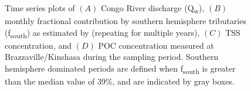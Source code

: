 \begin{figure}[p]
	\caption[Environmental parameter time-series plots]{Time series plots of $(A)$ Congo River discharge (Q\textsubscript{w}), $(B)$ monthly fractional contribution by southern hemisphere tributaries (f\textsubscript{south}) as estimated by \citet{Bricquet:1993ve} (repeating for multiple years), $(C)$ TSS concentration, and $(D)$ POC concentration measured at Brazzaville/Kinshasa during the sampling period. Southern hemisphere dominated periods are defined when f\textsubscript{south} is greater than the median value of 39\%, and are indicated by gray boxes.}
	\label{Ch4Fig:2} 
\end{figure}

